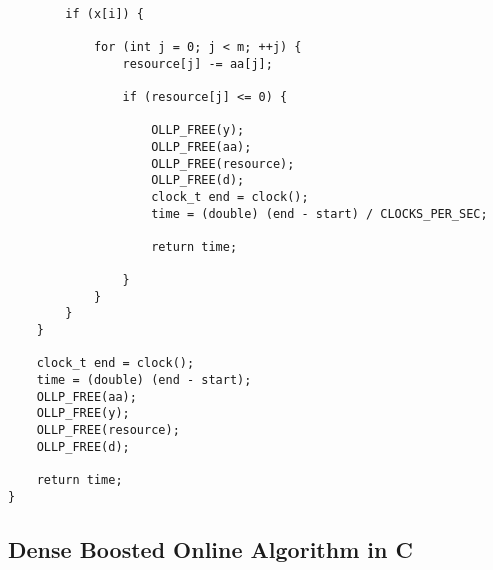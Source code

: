 \documentclass{article}
\begin{document}
\begin{lstlisting}
        
        if (x[i]) {
            
            for (int j = 0; j < m; ++j) {
                resource[j] -= aa[j];
                
                if (resource[j] <= 0) {
                    
                    OLLP_FREE(y);
                    OLLP_FREE(aa);
                    OLLP_FREE(resource);
                    OLLP_FREE(d);
                    clock_t end = clock();
                    time = (double) (end - start) / CLOCKS_PER_SEC;
                    
                    return time;
                    
                }
            }
        }
    }
    
    clock_t end = clock();
    time = (double) (end - start);
    OLLP_FREE(aa);
    OLLP_FREE(y);
    OLLP_FREE(resource);
    OLLP_FREE(d);
    
    return time;
}\end{lstlisting}

\subsection{Dense Boosted Online Algorithm in C}
\end{document}
